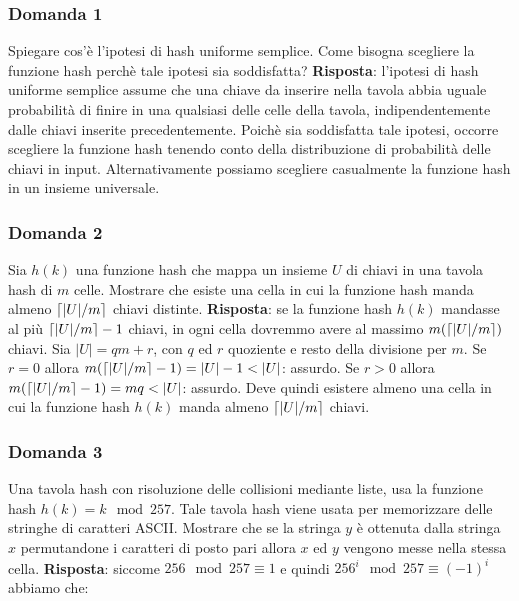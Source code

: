 \subsubsection*{Domanda 1}

Spiegare cos'è l'ipotesi di hash uniforme semplice. Come bisogna scegliere la funzione hash perchè tale ipotesi sia soddisfatta?
\linebreak
\linebreak
\textbf{Risposta}: l'ipotesi di hash uniforme semplice assume che una chiave da inserire nella tavola abbia uguale probabilità di finire in una qualsiasi delle celle della tavola, indipendentemente dalle chiavi inserite precedentemente. Poichè sia soddisfatta tale ipotesi, occorre scegliere la funzione hash tenendo conto della distribuzione di probabilità delle chiavi in input. Alternativamente possiamo scegliere casualmente la funzione hash in un insieme universale.

\subsubsection*{Domanda 2}

Sia $h(k)$ una funzione hash che mappa un insieme $U$ di chiavi in una tavola hash di $m$ celle. Mostrare che esiste una cella in cui la funzione hash manda almeno $\lceil|U|/m\rceil$ chiavi distinte.
\linebreak
\linebreak
\textbf{Risposta}: se la funzione hash $h(k)$ mandasse al più $\lceil|U|/m\rceil-1$ chiavi, in ogni cella dovremmo avere al massimo $m(\lceil|U|/m\rceil)$ chiavi. Sia $|U|=qm+r$, con $q$ ed $r$ quoziente e resto della divisione per $m$. Se $r=0$ allora $m(\ceil{|U|/m}-1)=|U|-1<|U|$: assurdo. Se $r>0$ allora $m(\ceil{|U|/m}-1)=mq<|U|$: assurdo. Deve quindi esistere almeno una cella in cui la funzione hash $h(k)$ manda almeno $\lceil|U|/m\rceil$ chiavi.

\subsubsection*{Domanda 3}

Una tavola hash con risoluzione delle collisioni mediante liste, usa la funzione hash $h(k)=k\mod 257$. Tale tavola hash viene usata per memorizzare delle stringhe di caratteri ASCII. Mostrare che se la stringa $y$ è ottenuta dalla stringa $x$ permutandone i caratteri di posto pari allora $x$ ed $y$ vengono messe nella stessa cella.
\linebreak
\linebreak
\textbf{Risposta}: siccome $256\mod 257 \equiv 1$ e quindi $256^i\mod 257 \equiv (-1)^i$ abbiamo che:

